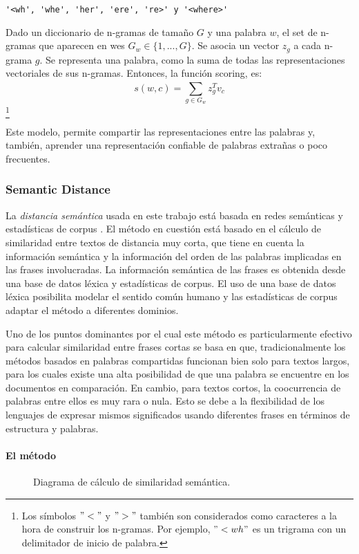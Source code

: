 \begin{verbatim}
'<wh', 'whe', 'her', 'ere', 're>' y '<where>'
\end{verbatim}
	
Dado un diccionario de n-gramas de tamaño \(G\) y una palabra \(w\), el set de n-gramas que aparecen en wes \(G_w \in \{1,..., G\}\). Se asocia un vector \(z_g\) a cada n-grama \(g\). Se representa una palabra, como la suma de todas las representaciones vectoriales de sus n-gramas. Entonces, la función scoring, es:
\[s(w,c) = \sum_{g \in G_w}^{}{}z_g^T v_c\]\footnote{Los símbolos \("<"\) y \(">"\) también son considerados como caracteres a la hora de construir los n-gramas. Por ejemplo, \("<wh"\) es un trigrama con un delimitador de inicio de palabra.}

Este modelo, permite compartir las representaciones entre las palabras y, también, aprender una representación confiable de palabras extrañas o poco frecuentes.

\subsubsection{Semantic Distance}
La \textit{distancia semántica} usada en este trabajo está basada en redes semánticas y estadísticas de corpus \citep{li2006sentence}. El método en cuestión está basado en el cálculo de similaridad entre textos de distancia muy corta, que tiene en cuenta la información semántica y la información del orden de las palabras implicadas en las frases involucradas. La información semántica de las frases es obtenida desde una base de datos léxica y estadísticas de corpus. El uso de una base de datos léxica posibilita modelar el sentido común humano y las estadísticas de corpus adaptar el método a diferentes dominios.

\bigskip Uno de los puntos dominantes por el cual este método es particularmente efectivo para calcular similaridad entre frases cortas se basa en que, tradicionalmente los métodos basados en palabras compartidas funcionan bien solo para textos largos, para los cuales existe una alta posibilidad de que una palabra se encuentre en los documentos en comparación. En cambio, para textos cortos, la coocurrencia de palabras entre ellos es muy rara o nula. Esto se debe a la flexibilidad de los lenguajes de expresar mismos significados usando diferentes frases en términos de estructura y palabras.

\paragraph{El método}
\begin{figure}
	\def\svgwidth{\linewidth}
	
	\caption{Diagrama de cálculo de similaridad semántica.}
\end{figure}


